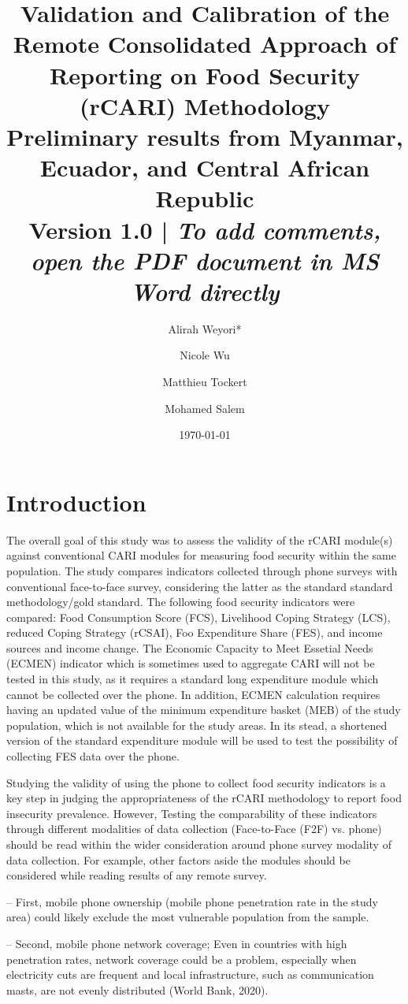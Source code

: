 \documentclass[11pt,harvard]{article}
\author{Alirah Weyori*  \and   Nicole Wu  \and  Matthieu Tockert  \and  Mohamed Salem}
\date{\today}
\title{Validation and Calibration of the Remote Consolidated Approach of Reporting on Food Security (rCARI) Methodology 
	\\ {\normalsize Preliminary results from Myanmar, Ecuador, and Central African Republic} 
	\\{\normalsize{Version 1.0}} | \emph{{\normalsize{To add comments, open the PDF document in MS Word directly}} }}
\begin{document}
	\maketitle \vspace{-1cm}
	\onehalfspacing
	\pagebreak
	\setlength{\parskip}{8pt} %
	
	\tableofcontents
	\pagebreak
		
\section{Introduction}

The overall goal of this study was to assess the validity of the rCARI module(s) against conventional CARI modules for measuring food security within the same population. The study compares indicators collected through phone surveys with conventional face-to-face survey, considering the latter as the standard standard methodology/gold standard. The following food security indicators were compared: Food Consumption Score (FCS), Livelihood Coping Strategy (LCS), reduced Coping Strategy (rCSAI), Foo Expenditure Share (FES), and income sources and income change. The Economic Capacity to Meet Essetial Needs (ECMEN) indicator which is sometimes used to aggregate CARI will not be tested in this study, as it requires a standard long expenditure module which cannot be collected over the phone. In addition, ECMEN calculation requires having an updated value of the minimum expenditure basket (MEB) of the study population, which is not available for the study areas. In its stead, a shortened version of the standard expenditure module will be used to test the possibility of collecting FES data over the phone.

Studying the validity of using the phone to collect food security indicators is a key step in judging the appropriateness of the rCARI methodology to report food insecurity prevalence. However, Testing the comparability of these indicators through different modalities of data collection (Face-to-Face (F2F) vs. phone) should be read within the wider consideration around phone survey modality of data collection. For example, other factors aside the modules should be considered while reading results of any remote survey.

–	First, mobile phone ownership (mobile phone penetration rate in the study area) could likely exclude the most vulnerable population from the sample. 

–	Second, mobile phone network coverage; Even in countries with high penetration rates, network coverage could be a problem, especially when electricity cuts are frequent and local infrastructure, such as communication masts, are not evenly distributed (World Bank, 2020).
\end{document}
